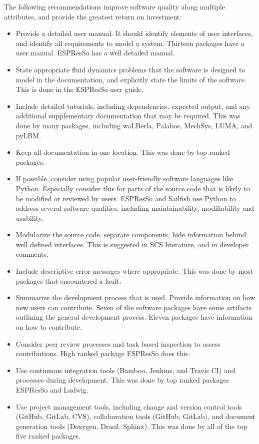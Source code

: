 \documentclass[final, 3p, times, authoryear]{elsarticle}
\begin{document}
The following recommendations improve software quality along multiple
attributes, and provide the greatest return on investment:

\begin{itemize}
	\item Provide a detailed user manual. It should identify elements of user interfaces, and identify all requirements to model a system. Thirteen packages have a user manual. ESPResSo has a well detailed manual.
	\item State appropriate fluid dynamics problems that the software is designed to model in the documentation, and explicitly state the limits of the software. This is done in the ESPResSo user guide.
	\item Include detailed tutorials, including dependencies, expected
	output, and any additional supplementary documentation that may be required. This was done by many packages, including waLBerla, Palabos, MechSys, LUMA, and pyLBM.
	\item Keep all documentation in one location. This was done by top ranked packages.
	\item If possible, consider using popular user-friendly software languages like Python. Especially consider this for parts of the source code that is likely to be modified or reviewed by users. ESPResSo and Sailfish use Python to address several software qualities, including maintainability, modifiability and usability.
	\item Modularize the source code, separate components, hide information behind well defined interfaces. This is suggested in SCS literature, and in developer comments.
	\item Include descriptive error messages where appropriate. This was done by most packages that encountered a fault.
	\item Summarize the development process that is used. Provide information on how new users can contribute. Seven of the software packages have some artifacts outlining the general development process. Eleven packages have information on how to contribute.
	\item Consider peer review processes and task based inspection to assess contributions. High ranked package ESPResSo does this.
	\item Use continuous integration tools (Bamboo, Jenkins, and Travis CI) and processes during development. This was done by top ranked packages ESPResSo and Ludwig.
	\item Use project management tools, including change and version control tools (GitHub, GitLab, CVS), collaboration tools (GitHub, GitLab), and document generation tools (Doxygen, Drasil, Sphinx). This was done by all of the top five ranked packages.
\end{itemize}
\end{document}
